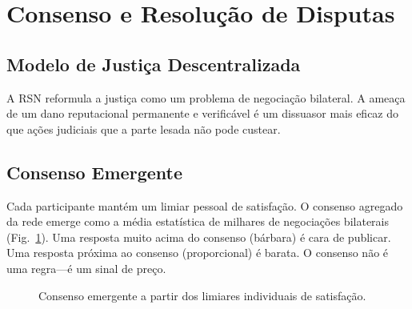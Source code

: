 \documentclass[11pt,a4paper,twocolumn]{article}
\begin{document}
\section{Consenso e Resolução de Disputas}

\subsection{Modelo de Justiça Descentralizada}

A RSN reformula a justiça como um problema de negociação bilateral. A ameaça de um dano reputacional permanente e verificável é um dissuasor mais eficaz do que ações judiciais que a parte lesada não pode custear.

\subsection{Consenso Emergente}

Cada participante mantém um limiar pessoal de satisfação. O consenso agregado da rede emerge como a média estatística de milhares de negociações bilaterais (Fig.~\ref{fig:consensus}). Uma resposta muito acima do consenso (bárbara) é cara de publicar. Uma resposta próxima ao consenso (proporcional) é barata. O consenso não é uma regra---é um sinal de preço.

\begin{figure}[ht]
\centering
{}
\caption{Consenso emergente a partir dos limiares individuais de satisfação.}
\label{fig:consensus}
\end{figure}
\end{document}
